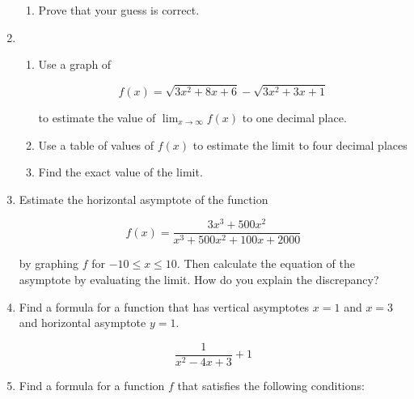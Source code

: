 \documentclass{article}
\begin{document}
\begin{enumerate}
\begin{enumerate}
			\item Prove that your guess is correct.
		\end{enumerate}

		\item
		\begin{enumerate}
			\item Use a graph of
			
			$$f(x) = \sqrt{3x^2 + 8x + 6} - \sqrt{3x^2 + 3x + 1}$$

			to estimate the value of $\lim _{x \to \infty} f(x)$ to one
			decimal place.

			\item Use a table of values of $f(x)$ to estimate the limit to
				four decimal places

			\item Find the exact value of the limit.
		\end{enumerate}

		\item Estimate the horizontal asymptote of the function

		$$f(x) = \frac{3x^3 + 500x^2}{x^3 + 500x^2 + 100x + 2000}$$

		by graphing $f$ for $-10 \leq x \leq 10$. Then calculate the
		equation of the asymptote by evaluating the limit. How do you
		explain the discrepancy?

		\item Find a formula for a function that has vertical asymptotes
		$x = 1$ and $x = 3$ and horizontal asymptote $y = 1$.

		$$\frac{1}{x^2 - 4x + 3} + 1$$

		\item Find a formula for a function $f$ that satisfies the following
			conditions:

			

	\end{enumerate}
\end{document}
